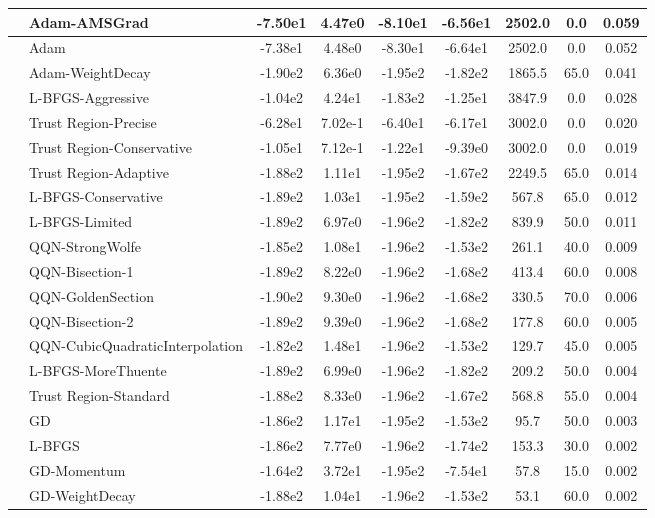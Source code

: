 \documentclass[10pt]{article}
\begin{document}
\begin{longtable}{|l|l|c|c|c|c|c|c|c|}
\hline
 & Adam-AMSGrad & -7.50e1 & 4.47e0 & -8.10e1 & -6.56e1 & 2502.0 & 0.0 & 0.059 \\
\hline
 & Adam & -7.38e1 & 4.48e0 & -8.30e1 & -6.64e1 & 2502.0 & 0.0 & 0.052 \\
\hline
 & Adam-WeightDecay & -1.90e2 & 6.36e0 & -1.95e2 & -1.82e2 & 1865.5 & 65.0 & 0.041 \\
\hline
 & L-BFGS-Aggressive & -1.04e2 & 4.24e1 & -1.83e2 & -1.25e1 & 3847.9 & 0.0 & 0.028 \\
\hline
 & Trust Region-Precise & -6.28e1 & 7.02e-1 & -6.40e1 & -6.17e1 & 3002.0 & 0.0 & 0.020 \\
\hline
 & Trust Region-Conservative & -1.05e1 & 7.12e-1 & -1.22e1 & -9.39e0 & 3002.0 & 0.0 & 0.019 \\
\hline
 & Trust Region-Adaptive & -1.88e2 & 1.11e1 & -1.95e2 & -1.67e2 & 2249.5 & 65.0 & 0.014 \\
\hline
 & L-BFGS-Conservative & -1.89e2 & 1.03e1 & -1.95e2 & -1.59e2 & 567.8 & 65.0 & 0.012 \\
\hline
 & L-BFGS-Limited & -1.89e2 & 6.97e0 & -1.96e2 & -1.82e2 & 839.9 & 50.0 & 0.011 \\
\hline
 & QQN-StrongWolfe & -1.85e2 & 1.08e1 & -1.96e2 & -1.53e2 & 261.1 & 40.0 & 0.009 \\
\hline
 & QQN-Bisection-1 & -1.89e2 & 8.22e0 & -1.96e2 & -1.68e2 & 413.4 & 60.0 & 0.008 \\
\hline
 & QQN-GoldenSection & -1.90e2 & 9.30e0 & -1.96e2 & -1.68e2 & 330.5 & 70.0 & 0.006 \\
\hline
 & QQN-Bisection-2 & -1.89e2 & 9.39e0 & -1.96e2 & -1.68e2 & 177.8 & 60.0 & 0.005 \\
\hline
 & QQN-CubicQuadraticInterpolation & -1.82e2 & 1.48e1 & -1.96e2 & -1.53e2 & 129.7 & 45.0 & 0.005 \\
\hline
 & L-BFGS-MoreThuente & -1.89e2 & 6.99e0 & -1.96e2 & -1.82e2 & 209.2 & 50.0 & 0.004 \\
\hline
 & Trust Region-Standard & -1.88e2 & 8.33e0 & -1.96e2 & -1.67e2 & 568.8 & 55.0 & 0.004 \\
\hline
 & GD & -1.86e2 & 1.17e1 & -1.95e2 & -1.53e2 & 95.7 & 50.0 & 0.003 \\
\hline
 & L-BFGS & -1.86e2 & 7.77e0 & -1.96e2 & -1.74e2 & 153.3 & 30.0 & 0.002 \\
\hline
 & GD-Momentum & -1.64e2 & 3.72e1 & -1.95e2 & -7.54e1 & 57.8 & 15.0 & 0.002 \\
\hline
 & GD-WeightDecay & -1.88e2 & 1.04e1 & -1.96e2 & -1.53e2 & 53.1 & 60.0 & 0.002 \\

\end{longtable}
\end{document}
